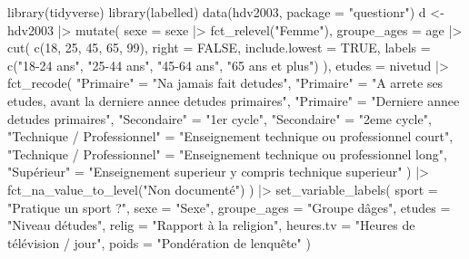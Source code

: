 \documentclass[
  letterpaper,
  DIV=11,
  numbers=noendperiod,
  oneside]{scrreprt}
\newenvironment{Shaded}{\begin{snugshade}}{\end{snugshade}}
\newcommand{\AttributeTok}[1]{\textcolor[rgb]{0.40,0.45,0.13}{#1}}
\newcommand{\ConstantTok}[1]{\textcolor[rgb]{0.56,0.35,0.01}{#1}}
\newcommand{\DecValTok}[1]{\textcolor[rgb]{0.68,0.00,0.00}{#1}}
\newcommand{\FunctionTok}[1]{\textcolor[rgb]{0.28,0.35,0.67}{#1}}
\newcommand{\NormalTok}[1]{\textcolor[rgb]{0.00,0.23,0.31}{#1}}
\newcommand{\OtherTok}[1]{\textcolor[rgb]{0.00,0.23,0.31}{#1}}
\newcommand{\SpecialCharTok}[1]{\textcolor[rgb]{0.37,0.37,0.37}{#1}}
\newcommand{\StringTok}[1]{\textcolor[rgb]{0.13,0.47,0.30}{#1}}
\begin{document}
\begin{Shaded}
\begin{Highlighting}[]
\FunctionTok{library}\NormalTok{(tidyverse)}
\FunctionTok{library}\NormalTok{(labelled)}
\FunctionTok{data}\NormalTok{(hdv2003, }\AttributeTok{package =} \StringTok{"questionr"}\NormalTok{)}
\NormalTok{d }\OtherTok{\textless{}{-}}
\NormalTok{  hdv2003 }\SpecialCharTok{|\textgreater{}} 
  \FunctionTok{mutate}\NormalTok{(}
    \AttributeTok{sexe =}\NormalTok{ sexe }\SpecialCharTok{|\textgreater{}} \FunctionTok{fct\_relevel}\NormalTok{(}\StringTok{"Femme"}\NormalTok{),}
    \AttributeTok{groupe\_ages =}\NormalTok{ age }\SpecialCharTok{|\textgreater{}}
      \FunctionTok{cut}\NormalTok{(}
        \FunctionTok{c}\NormalTok{(}\DecValTok{18}\NormalTok{, }\DecValTok{25}\NormalTok{, }\DecValTok{45}\NormalTok{, }\DecValTok{65}\NormalTok{, }\DecValTok{99}\NormalTok{),}
        \AttributeTok{right =} \ConstantTok{FALSE}\NormalTok{,}
        \AttributeTok{include.lowest =} \ConstantTok{TRUE}\NormalTok{,}
        \AttributeTok{labels =} \FunctionTok{c}\NormalTok{(}\StringTok{"18{-}24 ans"}\NormalTok{, }\StringTok{"25{-}44 ans"}\NormalTok{,}
                   \StringTok{"45{-}64 ans"}\NormalTok{, }\StringTok{"65 ans et plus"}\NormalTok{)}
\NormalTok{      ),}
    \AttributeTok{etudes =}\NormalTok{ nivetud }\SpecialCharTok{|\textgreater{}} 
      \FunctionTok{fct\_recode}\NormalTok{(}
        \StringTok{"Primaire"} \OtherTok{=} \StringTok{"N\textquotesingle{}a jamais fait d\textquotesingle{}etudes"}\NormalTok{,}
        \StringTok{"Primaire"} \OtherTok{=} \StringTok{"A arrete ses etudes, avant la derniere annee d\textquotesingle{}etudes primaires"}\NormalTok{,}
        \StringTok{"Primaire"} \OtherTok{=} \StringTok{"Derniere annee d\textquotesingle{}etudes primaires"}\NormalTok{,}
        \StringTok{"Secondaire"} \OtherTok{=} \StringTok{"1er cycle"}\NormalTok{,}
        \StringTok{"Secondaire"} \OtherTok{=} \StringTok{"2eme cycle"}\NormalTok{,}
        \StringTok{"Technique / Professionnel"} \OtherTok{=} \StringTok{"Enseignement technique ou professionnel court"}\NormalTok{,}
        \StringTok{"Technique / Professionnel"} \OtherTok{=} \StringTok{"Enseignement technique ou professionnel long"}\NormalTok{,}
        \StringTok{"Supérieur"} \OtherTok{=} \StringTok{"Enseignement superieur y compris technique superieur"}
\NormalTok{    ) }\SpecialCharTok{|\textgreater{}} 
    \FunctionTok{fct\_na\_value\_to\_level}\NormalTok{(}\StringTok{"Non documenté"}\NormalTok{)  }
\NormalTok{  ) }\SpecialCharTok{|\textgreater{}} 
  \FunctionTok{set\_variable\_labels}\NormalTok{(}
    \AttributeTok{sport =} \StringTok{"Pratique un sport ?"}\NormalTok{,}
    \AttributeTok{sexe =} \StringTok{"Sexe"}\NormalTok{,}
    \AttributeTok{groupe\_ages =} \StringTok{"Groupe d\textquotesingle{}âges"}\NormalTok{,}
    \AttributeTok{etudes =} \StringTok{"Niveau d\textquotesingle{}études"}\NormalTok{,}
    \AttributeTok{relig =} \StringTok{"Rapport à la religion"}\NormalTok{,}
    \AttributeTok{heures.tv =} \StringTok{"Heures de télévision / jour"}\NormalTok{,}
    \AttributeTok{poids =} \StringTok{"Pondération de l\textquotesingle{}enquête"}
\NormalTok{  )}
\end{Highlighting}
\end{Shaded}
\end{document}
